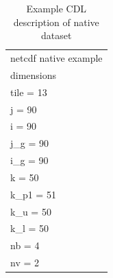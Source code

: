 \begin{longtable}{|p{\textwidth}|}
\caption{Example CDL description of native dataset}
\label{tab:cdl-native} \\
\hline \endhead
\hline \endfoot
netcdf native example\\
dimensions\\
\hline
\rowcolor{YellowGreen}  tile = 13\\
\rowcolor{YellowGreen}  j = 90\\
\rowcolor{YellowGreen}  i = 90\\
\rowcolor{YellowGreen}  j\_g = 90\\
\rowcolor{YellowGreen}  i\_g = 90\\
\rowcolor{YellowGreen}  k = 50\\
\rowcolor{YellowGreen}  k\_p1 = 51\\
\rowcolor{YellowGreen}  k\_u = 50\\
\rowcolor{YellowGreen}  k\_l = 50\\
\rowcolor{YellowGreen}  nb = 4\\
\rowcolor{YellowGreen}  nv = 2\\
\hline


\end{longtable}

